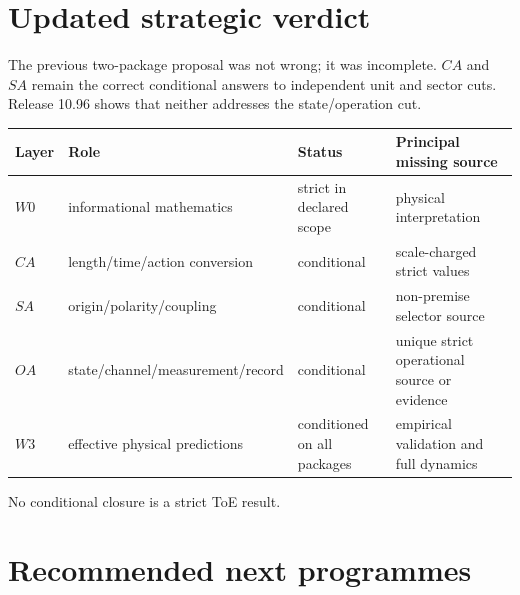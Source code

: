 \documentclass[11pt,a4paper]{article}
\begin{document}
\section{Updated strategic verdict}

The previous two-package proposal was not wrong; it was incomplete.  $CA$ and
$SA$ remain the correct conditional answers to independent unit and sector
cuts.  Release 10.96 shows that neither addresses the state/operation cut.

\begin{longtable}{@{}p{}p{}p{}p{}@{}}
\toprule
Layer & Role & Status & Principal missing source \\
\midrule\endhead
$W0$ & informational mathematics & strict in declared scope & physical interpretation \\
$CA$ & length/time/action conversion & conditional & scale-charged strict values \\
$SA$ & origin/polarity/coupling & conditional & non-premise selector source \\
$OA$ & state/channel/measurement/record & conditional & unique strict operational source or evidence \\
$W3$ & effective physical predictions & conditioned on all packages & empirical validation and full dynamics \\
\bottomrule
\end{longtable}

No conditional closure is a strict ToE result.

\section{Recommended next programmes}
\end{document}
